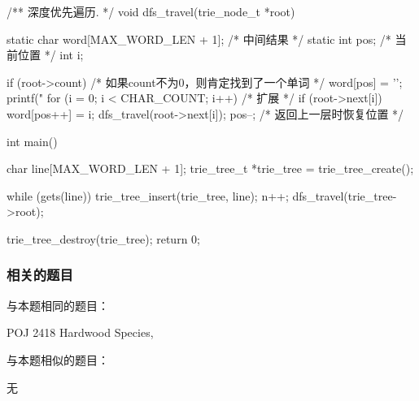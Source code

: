 \begin{Codex}[label=hardwood_species.c]
/** 深度优先遍历. */
void dfs_travel(trie_node_t *root) {
    static char word[MAX_WORD_LEN + 1]; /* 中间结果 */
    static int pos;  /* 当前位置 */
    int i;

    if (root->count) { /* 如果count不为0，则肯定找到了一个单词 */
        word[pos] = '\0';
        printf("%
    }
    for (i = 0; i < CHAR_COUNT; i++) {  /* 扩展 */
        if (root->next[i]) {
            word[pos++] = i;
            dfs_travel(root->next[i]);
            pos--; /* 返回上一层时恢复位置 */
        }
    }
}

int main() {
    char line[MAX_WORD_LEN + 1];
    trie_tree_t *trie_tree = trie_tree_create();

    while (gets(line)) {
        trie_tree_insert(trie_tree, line);
        n++;
    }
    dfs_travel(trie_tree->root);

    trie_tree_destroy(trie_tree);
    return 0;
}
\end{Codex}


\subsubsection{相关的题目}
与本题相同的题目：
\begindot
\item POJ 2418 Hardwood Species, 
\myenddot

与本题相似的题目：
\begindot
\item 无
\myenddot
